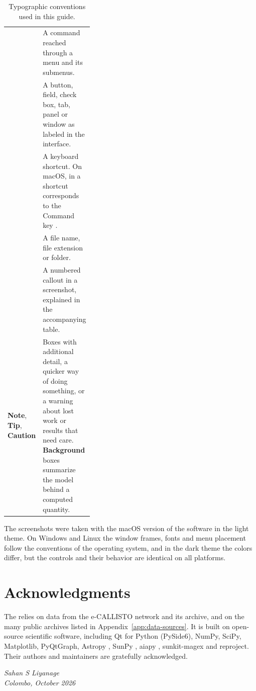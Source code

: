 \begin{table}[!htbp]
  \centering
  \caption{Typographic conventions used in this guide.}
  \label{tab:conventions}
  \small
  \begin{tabularx}{\linewidth}{@{}P{0.34\linewidth}L@{}}
    \toprule
     &  \\
    \midrule
     & A command reached through a menu and its submenus. \\
     & A button, field, check box, tab, panel or window as labeled in the interface. \\
     & A keyboard shortcut. On macOS,  in a shortcut corresponds to the Command key . \\
     & A file name, file extension or folder. \\
     & A numbered callout in a screenshot, explained in the accompanying table. \\
    \textsf{\textbf{\textcolor{accent}{Note}}}, \textsf{\textbf{\textcolor{tipc}{Tip}}}, \textsf{\textbf{\textcolor{cautionc}{Caution}}} & Boxes with additional detail, a quicker way of doing something, or a warning about lost work or results that need care. \textsf{\textbf{\textcolor{scic}{Background}}} boxes summarize the model behind a computed quantity. \\
    \bottomrule
  \end{tabularx}
\end{table}

The screenshots were taken with the macOS version of the software in the light theme.
On Windows and Linux the window frames, fonts and menu placement follow the conventions
of the operating system, and in the dark theme the colors differ, but the controls and
their behavior are identical on all platforms.

\section*{Acknowledgments}

The \appname{} relies on data from the e-CALLISTO network and its archive, and on the many
public archives listed in Appendix~\ref{app:data-sources}. It is built on open-source
scientific software, including Qt for Python (PySide6), NumPy, SciPy, Matplotlib,
PyQtGraph, Astropy \parencite{astropy2022}, SunPy \parencite{sunpy2020}, aiapy
\parencite{barnes2020}, sunkit-magex \parencite{stansby2020} and reproject. Their authors and
maintainers are gratefully acknowledged.

\begin{flushright}
  \textit{Sahan S Liyanage}\\
  \textit{Colombo, October 2026}
\end{flushright}
